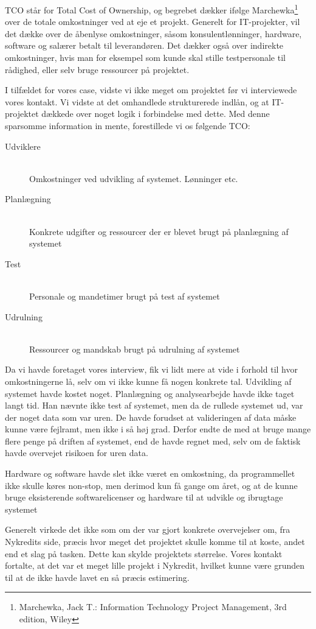 TCO står for Total Cost of Ownership, og begrebet dækker ifølge
Marchewka\footnote{Marchewka, Jack T.: Information Technology Project
Management, 3rd edition, Wiley} over de totale omkostninger ved at eje et
projekt. Generelt for IT-projekter, vil det dække over de åbenlyse omkostninger,
såsom konsulentlønninger, hardware, software og salærer betalt til leverandøren.
Det dækker også over indirekte omkostninger, hvis man for eksempel som kunde
skal stille testpersonale til rådighed, eller selv bruge ressourcer på
projektet.

I tilfældet for vores case, vidste vi ikke meget om projektet før vi
interviewede vores kontakt. Vi vidste at det omhandlede strukturerede indlån, og
at IT-projektet dækkede over noget logik i forbindelse med dette. Med denne
sparsomme information in mente, forestillede vi os følgende TCO:

\begin{description}
  \item[Udviklere]\hfill
  \\
  Omkostninger ved udvikling af systemet. Lønninger etc.
  \item[Planlægning] \hfill
  \\
  Konkrete udgifter og ressourcer der er blevet brugt på planlægning af systemet
  \item[Test]\hfill
  \\
  Personale og mandetimer brugt på test af systemet
  \item[Udrulning]\hfill
  \\
  Ressourcer og mandskab brugt på udrulning af systemet
\end{description}

Da vi havde foretaget vores interview, fik vi lidt mere at vide i forhold til
hvor omkostningerne lå, selv om vi ikke kunne få nogen konkrete tal. Udvikling
af systemet havde kostet noget. Planlægning og analysearbejde havde ikke taget
langt tid. Han nævnte ikke test af systemet, men da de rullede systemet ud, var
der noget data som var uren. De havde forudset at valideringen af data måske
kunne være fejlramt, men ikke i så høj grad. Derfor endte de med at bruge mange
flere penge på driften af systemet, end de havde regnet med, selv om de faktisk
havde overvejet risikoen for uren data.

Hardware og software havde slet ikke været en omkostning, da programmellet ikke
skulle køres non-stop, men derimod kun få gange om året, og at de kunne bruge
eksisterende softwarelicenser og hardware til at udvikle og ibrugtage systemet

Generelt virkede det ikke som om der var gjort konkrete overvejelser om, fra
Nykredits side, præcis hvor meget det projektet skulle komme til at koste, andet
end et slag på tasken.  Dette kan skylde projektets størrelse. Vores kontakt
fortalte, at det var et meget lille projekt i Nykredit, hvilket kunne være
grunden til at de ikke havde lavet en så præcis estimering.
